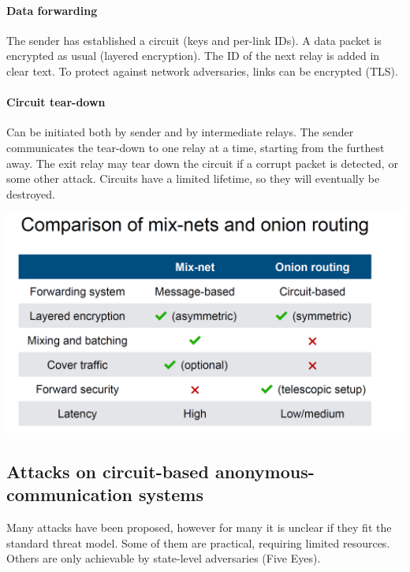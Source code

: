 \paragraph{Data forwarding}

The sender has established a circuit (keys and per-link IDs). A data packet is encrypted as usual (layered encryption). The ID of the next relay is added in clear text. To protect against network adversaries, links can be encrypted (TLS).

\paragraph{Circuit tear-down}

Can be initiated both by sender and by intermediate relays. The sender communicates the tear-down to one relay at a time, starting from the furthest away. The exit relay may tear down the circuit if a corrupt packet is detected, or some other attack. Circuits have a limited lifetime, so they will eventually be destroyed.

\begin{minipage}{\linewidth}
    \centering      
    \includegraphics[width=\linewidth]{Figures/Anym_mix_nets.PNG} 
\end{minipage}

\subsection{Attacks on circuit-based anonymous-communication systems}

Many attacks have been proposed, however for many it is unclear if they fit the standard threat model. Some of them are practical, requiring limited resources. Others are only achievable by state-level adversaries (Five Eyes).

